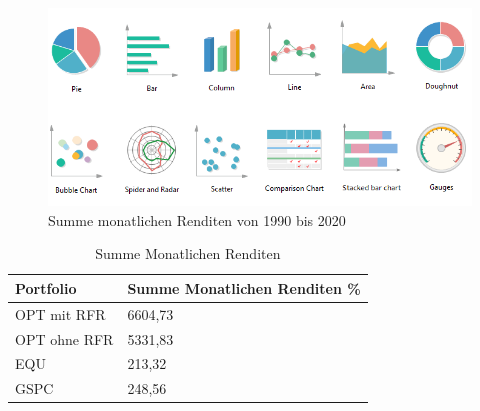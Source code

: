 \documentclass[12pt]{article}
\begin{document}
            
            

            \begin{figure}[ht]
            
                \begin{center}

                    \includegraphics[scale=0.5]{types-of-graphs.png}
                    \caption{Summe monatlichen Renditen von 1990 bis 2020}
                    \label{s-m-renditen-fig}
        
                \end{center}
                
            \end{figure}


           

            \begin{table}[htp]
                \begin{center}
                    
                    \begin{tabular}{ | l | l | }

                        \hline
                        \textbf{Portfolio}   & \textbf{Summe Monatlichen Renditen \%} \\
                        \hline
                        OPT mit RFR          &      6604,73 \\            
                        OPT ohne RFR         &      5331,83 \\
                        EQU                  &      213,32 \\                 
                        GSPC                 &      248,56 \\          
                             
                        \hline

                    \end{tabular}
                    \caption{Summe Monatlichen Renditen}
                    \label{s-m-renditen-tab}
                \end{center}
            \end{table}
\end{document}
